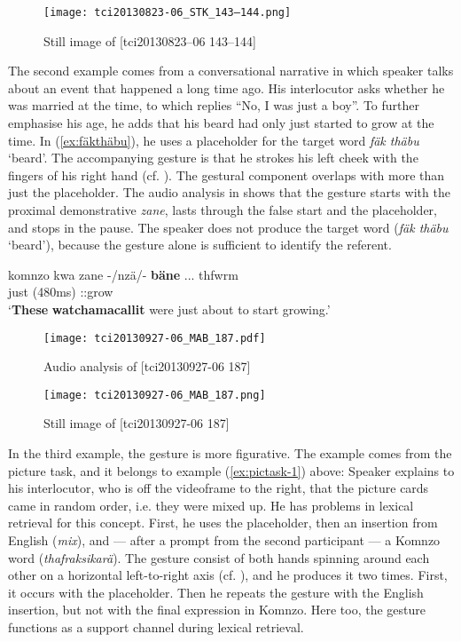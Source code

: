 \documentclass[output=paper,colorlinks,citecolor=brown]{langscibook}
\begin{document}
\begin{figure}
    \texttt{[image: tci20130823-06\_STK\_143–144.png]}
    \caption{Still image of [tci20130823–06  143--144]}
    \label{fig:doehler:fothrzfth-still}
\end{figure}

The second example comes from a conversational narrative in which speaker  talks about an event that happened a long time ago. His interlocutor  asks whether he was married at the time, to which  replies ``No, I was just a boy''. To further emphasise his age, he adds that his beard had only just started to grow at the time. In (\ref{ex:fäkthäbu}), he uses a placeholder for the target word \textit{fäk thäbu} `beard'. The accompanying gesture is that he strokes his left cheek with the fingers of his right hand (cf. ). The gestural component overlaps with more than just the placeholder. The audio analysis in  shows that the gesture starts with the proximal demonstrative \textit{zane}, lasts through the false start and the placeholder, and stops in the pause. The speaker does not produce the target word (\textit{fäk thäbu} `beard'), because the gesture alone is sufficient to identify the referent.

\ea \label{ex:fäkthäbu}
    \gll komnzo kwa zane -/nzä/- \textbf{bäne} ... thfwrm\\
    just     (480ms) ::grow\\
    \glt `\textbf{These} \textbf{watchamacallit} were just about to start growing.' 
\z

\begin{figure}
    \texttt{[image: tci20130927-06\_MAB\_187.pdf]}
    \caption{Audio analysis of [tci20130927-06  187]}
    \label{fig:doehler:fäkthäbu}
\end{figure}

\begin{figure}
    \texttt{[image: tci20130927-06\_MAB\_187.png]}
    \caption{Still image of [tci20130927-06  187]}
    \label{fig:doehler:fäkthäbu-still}
\end{figure}

In the third example, the gesture is more figurative. The example comes from the picture task, and it belongs to example (\ref{ex:pictask-1}) above: Speaker  explains to his interlocutor, who is off the videoframe to the right, that the picture cards came in random order, i.e. they were mixed up. He has problems in lexical retrieval for this concept. First, he uses the placeholder, then an insertion from English (\textit{mix}), and — after a prompt from the second participant  — a Komnzo word (\textit{thafraksikarä}). The gesture consist of both hands spinning around each other on a horizontal left-to-right axis (cf. ), and he produces it two times. First, it occurs with the placeholder. Then he repeats the gesture with the English insertion, but not with the final expression in Komnzo. Here too, the gesture functions as a support channel during lexical retrieval.
\end{document}
